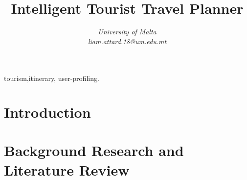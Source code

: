 \documentclass[conference]{IEEEtran}
\title{Intelligent Tourist Travel Planner}
\author{\IEEEauthorblockN{Liam Attard [0299300L] }
\IEEEauthorblockA{Department of Artificial Intelligence} 
\textit{University of Malta}\\
\textit{liam.attard.18@um.edu.mt}}
\begin{document}
  \maketitle

  \begin{abstract}
  \end{abstract}

  \begin{IEEEkeywords}
  tourism,itinerary, user-profiling.
  \end{IEEEkeywords}

  \section{Introduction}
    

  \section{Background Research and Literature Review}
    

  
  
\end{document}
